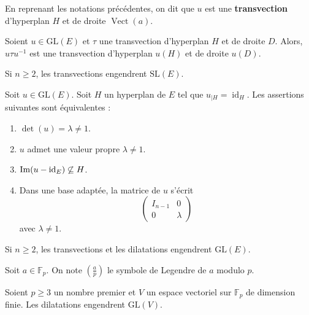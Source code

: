   \begin{definition}
    En reprenant les notations précédentes, on dit que $u$ est une \textbf{transvection} d'hyperplan $H$ et de droite $\operatorname{Vect}(a)$.
  \end{definition}

  \begin{proposition}
    Soient $u \in \mathrm{GL}(E)$ et $\tau$ une transvection d'hyperplan $H$ et de droite $D$. Alors, $u \tau u^{-1}$ est une transvection d'hyperplan $u(H)$ et de droite $u(D)$.
  \end{proposition}

  \begin{theorem}
    Si $n \geq 2$, les transvections engendrent $\mathrm{SL}(E)$.
  \end{theorem}

  \begin{proposition}
    Soit $u \in \mathrm{GL}(E)$. Soit $H$ un hyperplan de $E$ tel que $u_{|H} = \operatorname{id}_H$. Les assertions suivantes sont équivalentes :
    \begin{enumerate}[label={\bfseries(\roman*)}]
      \item $\det(u) = \lambda \neq 1$.
      \item $u$ admet une valeur propre $\lambda \neq 1$.
      \item $\mathrm{Im}(u - \operatorname{id}_E) \not\subseteq H$.
      \item Dans une base adaptée, la matrice de $u$ s'écrit
      \[
      \begin{pmatrix}
        I_{n-1} & 0 \\
        0 & \lambda
      \end{pmatrix}
      \]
      avec $\lambda \neq 1$.
    \end{enumerate}
  \end{proposition}

  \begin{theorem}
    Si $n \geq 2$, les transvections et les dilatations engendrent $\mathrm{GL}(E)$.
  \end{theorem}


  \begin{notation}
    Soit $a \in \mathbb{F}_p$. On note $\left( \frac{a}{p} \right)$ le symbole de Legendre de $a$ modulo $p$.
  \end{notation}

  \begin{lemma}
    Soient $p \geq 3$ un nombre premier et $V$ un espace vectoriel sur $\mathbb{F}_p$ de dimension finie. Les dilatations engendrent $\mathrm{GL}(V)$.
  \end{lemma}

